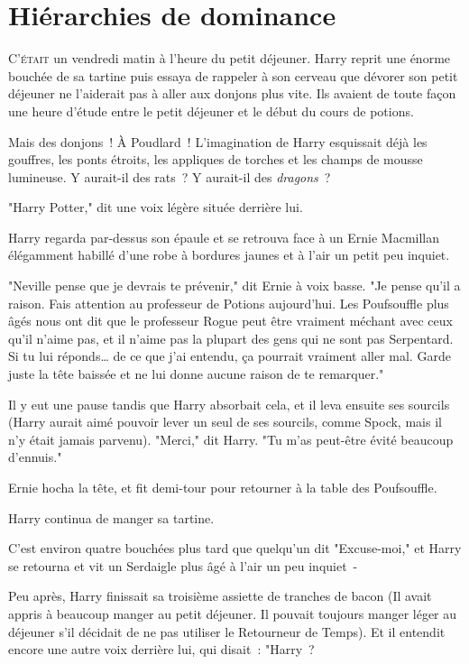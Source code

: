 \chapter{Hiérarchies de dominance}

\lettrine{C}{'était} un vendredi matin à l'heure du petit déjeuner. Harry reprit une énorme bouchée de sa tartine puis essaya de rappeler à son cerveau que dévorer son petit déjeuner ne l'aiderait pas à aller aux donjons plus vite. Ils avaient de toute façon une heure d'étude entre le petit déjeuner et le début du cours de potions.

Mais des donjons~! À Poudlard~! L'imagination de Harry esquissait déjà les gouffres, les ponts étroits, les appliques de torches et les champs de mousse lumineuse. Y aurait-il des rats~? Y aurait-il des \emph{dragons}~?

"Harry Potter," dit une voix légère située derrière lui.

Harry regarda par-dessus son épaule et se retrouva face à un Ernie Macmillan élégamment habillé d’une robe à bordures jaunes et à l'air un petit peu inquiet.

"Neville pense que je devrais te prévenir," dit Ernie à voix basse. "Je pense qu'il a raison. Fais attention au professeur de Potions aujourd'hui. Les Poufsouffle plus âgés nous ont dit que le professeur Rogue peut être vraiment méchant avec ceux qu'il n'aime pas, et il n'aime pas la plupart des gens qui ne sont pas Serpentard. Si tu lui réponds… de ce que j'ai entendu, ça pourrait vraiment aller mal. Garde juste la tête baissée et ne lui donne aucune raison de te remarquer."

Il y eut une pause tandis que Harry absorbait cela, et il leva ensuite ses sourcils (Harry aurait aimé pouvoir lever un seul de ses sourcils, comme Spock, mais il n'y était jamais parvenu). "Merci," dit Harry. "Tu m'as peut-être évité beaucoup d'ennuis."

Ernie hocha la tête, et fit demi-tour pour retourner à la table des Poufsouffle.

Harry continua de manger sa tartine.

C'est environ quatre bouchées plus tard que quelqu'un dit "Excuse-moi," et Harry se retourna et vit un Serdaigle plus âgé à l'air un peu inquiet~-

Peu après, Harry finissait sa troisième assiette de tranches de bacon (Il avait appris à beaucoup manger au petit déjeuner. Il pouvait toujours manger léger au déjeuner s'il décidait de ne pas utiliser le Retourneur de Temps). Et il entendit encore une autre voix derrière lui, qui disait~: "Harry~?

